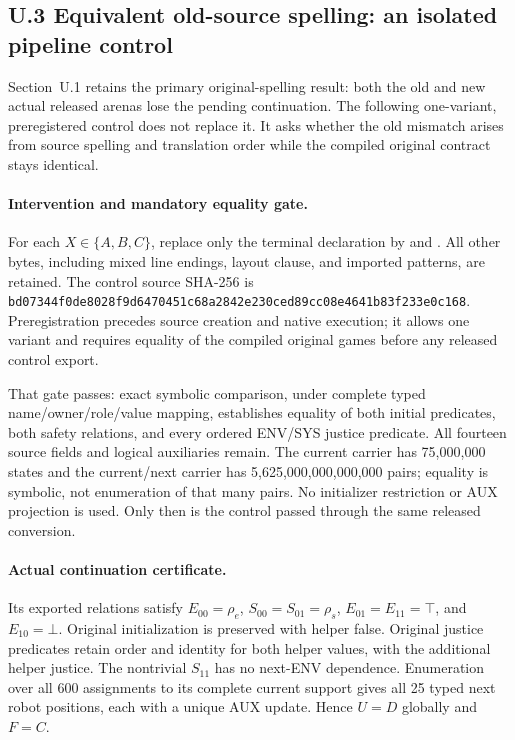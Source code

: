 \subsection*{U.3 Equivalent old-source spelling: an isolated pipeline control}
\label{supp:equivalent-old-control}
Section~U.1 retains the primary original-spelling result: both the old
and new actual released arenas lose the pending continuation. The
following one-variant, preregistered control does not replace it.
It asks whether the old mismatch arises from source spelling and
translation order while the compiled original contract stays identical.

\paragraph{Intervention and mandatory equality gate.}
For each $X\in\{A,B,C\}$, replace only the terminal declaration
 by  and
. All other bytes, including mixed line
endings, layout clause, and imported patterns, are retained. The
control source SHA-256 is
\nolinkurl{bd07344f0de8028f9d6470451c68a2842e230ced89cc08e4641b83f233e0c168}.
Preregistration precedes source creation and native execution; it allows
one variant and requires equality of the compiled original games before
any released control export.

That gate passes: exact symbolic comparison, under complete typed
name/owner/role/value mapping, establishes equality of both initial
predicates, both safety relations, and every ordered ENV/SYS justice
predicate. All fourteen source fields and logical auxiliaries remain.
The current carrier has 75,000,000 states and the current/next carrier
has 5,625,000,000,000,000 pairs; equality is symbolic, not enumeration
of that many pairs. No initializer restriction or AUX projection is used.
Only then is the control passed through the same released conversion.

\paragraph{Actual continuation certificate.}
Its exported relations satisfy $E_{00}=\rho_e$,
$S_{00}=S_{01}=\rho_s$, $E_{01}=E_{11}=\top$, and $E_{10}=\bot$.
Original initialization is preserved with helper false. Original justice
predicates retain order and identity for both helper values, with the
additional helper justice. The nontrivial $S_{11}$ has no next-ENV
dependence. Enumeration over all 600 assignments to its complete
current support gives all 25 typed next robot positions, each with a
unique AUX update. Hence $U=D$ globally and $F=C$.

